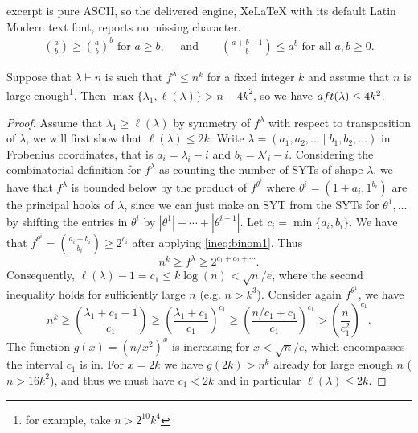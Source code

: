 \documentclass[10pt,a4paper]{amsart}
\newcommand{\la}{\lambda}
\begin{document}
excerpt is pure ASCII, so the delivered engine, XeLaTeX with its default Latin Modern text font, reports no missing character.
\begin{align}\label{ineq:binom1}
\binom{a}{b} \geq \left(\frac{a}{b}\right)^b \text{ for $a \geq b$}, \quad \text{ and} \qquad \binom{a+b-1}{b} \leq a^b \text { for all $a,b \geq 0$}.
\end{align}

\begin{prop}\label{prop:fixed_aft}
Suppose that $\la\vdash n$ is such that $f^\la \leq n^k $ for a fixed integer $k$ and assume that $n$ is large enough\footnote{for example, take $n>2^{10}k^4$}. Then $\max\{ \la_1 , \ell(\la)\}> n-4k^2$, so we have ${\rm aft}(\la) \leq 4k^2$. 
\end{prop}

\begin{proof}
Assume that $\la_1 \geq \ell(\la)$ by symmetry of $f^\la$ with respect to transposition of $\la$, we will first show that $\ell(\la)\leq 2k$.  Write $\la=(a_1,a_2,\ldots \mid b_1,b_2,\ldots)$ in Frobenius coordinates, that is $a_i = \la_i-i$ and $b_i = \la'_i-i$. Considering the combinatorial definition for $f^\la$ as counting the number of SYTs of shape $\la$, we have that $f^\la$ is bounded below by the product of $f^{\theta^i}$ where $\theta^i = (1+a_i,1^{b_i})$ are the principal hooks of $\la$, since we can just make an SYT from the SYTs for $\theta^1,\ldots$ by shifting the entries in $\theta^i$ by $|\theta^1|+\cdots+|\theta^{i-1}|$. Let $c_i=\min\{a_i,b_i\}$. We have that $f^{\theta^i} = \binom{a_i+b_i}{b_i} \geq 2^{c_i}$ after applying \eqref{ineq:binom1}. Thus 
$$n^k \geq f^\la \geq 2^{c_1+c_2+\cdots}. $$
Consequently, $\ell(\la)-1=c_1 \leq k\log(n)<\sqrt{n}/e$, where the second inequality holds for sufficiently large $n$ (e.g. $n>k^3$). 
Consider again $f^{\theta^1}$, we have
$$n^k \geq \binom{ \la_1 + c_1-1}{c_1} \geq \left(\frac{ \la_1+c_1}{c_1}\right)^{c_1} \geq \left( \frac{n/c_1 +c_1}{c_1 }\right)^{c_1}>\left(\frac{n}{c_1^2}\right)^{c_1}.$$
The function $g(x)= (n/x^2)^x$ is increasing for $x<\sqrt{n}/e$, which encompasses the interval $c_1$ is in. For $x=2k$ we have $g(2k)>n^k$ already for large enough $n$ ($n>16k^2$), and thus we must have $c_1<2k$
 and in particular $\ell(\la)\leq 2k$.


\end{proof}
\end{document}
